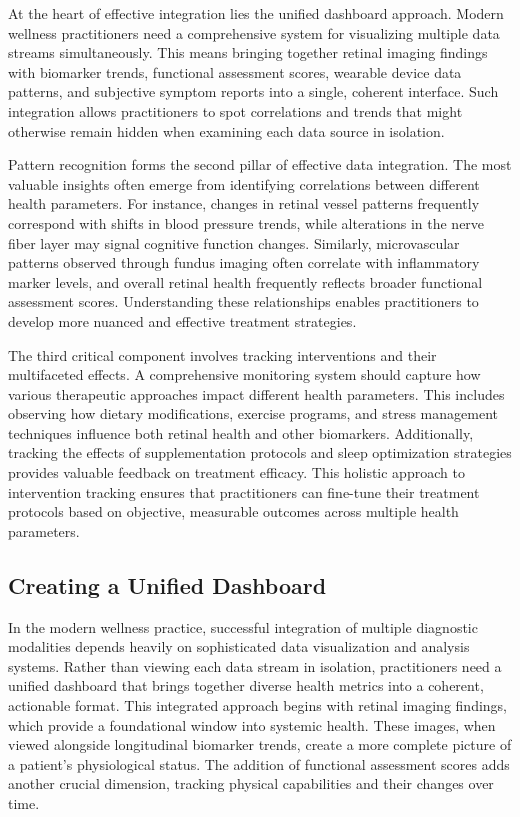 \documentclass[
  Letterpaper,
]{scrbook}
\begin{document}
At the heart of effective integration lies the unified dashboard
approach. Modern wellness practitioners need a comprehensive system for
visualizing multiple data streams simultaneously. This means bringing
together retinal imaging findings with biomarker trends, functional
assessment scores, wearable device data patterns, and subjective symptom
reports into a single, coherent interface. Such integration allows
practitioners to spot correlations and trends that might otherwise
remain hidden when examining each data source in isolation.

Pattern recognition forms the second pillar of effective data
integration. The most valuable insights often emerge from identifying
correlations between different health parameters. For instance, changes
in retinal vessel patterns frequently correspond with shifts in blood
pressure trends, while alterations in the nerve fiber layer may signal
cognitive function changes. Similarly, microvascular patterns observed
through fundus imaging often correlate with inflammatory marker levels,
and overall retinal health frequently reflects broader functional
assessment scores. Understanding these relationships enables
practitioners to develop more nuanced and effective treatment
strategies.

The third critical component involves tracking interventions and their
multifaceted effects. A comprehensive monitoring system should capture
how various therapeutic approaches impact different health parameters.
This includes observing how dietary modifications, exercise programs,
and stress management techniques influence both retinal health and other
biomarkers. Additionally, tracking the effects of supplementation
protocols and sleep optimization strategies provides valuable feedback
on treatment efficacy. This holistic approach to intervention tracking
ensures that practitioners can fine-tune their treatment protocols based
on objective, measurable outcomes across multiple health parameters.

\subsection{Creating a Unified
Dashboard}\label{creating-a-unified-dashboard}

In the modern wellness practice, successful integration of multiple
diagnostic modalities depends heavily on sophisticated data
visualization and analysis systems. Rather than viewing each data stream
in isolation, practitioners need a unified dashboard that brings
together diverse health metrics into a coherent, actionable format. This
integrated approach begins with retinal imaging findings, which provide
a foundational window into systemic health. These images, when viewed
alongside longitudinal biomarker trends, create a more complete picture
of a patient's physiological status. The addition of functional
assessment scores adds another crucial dimension, tracking physical
capabilities and their changes over time.
\end{document}
